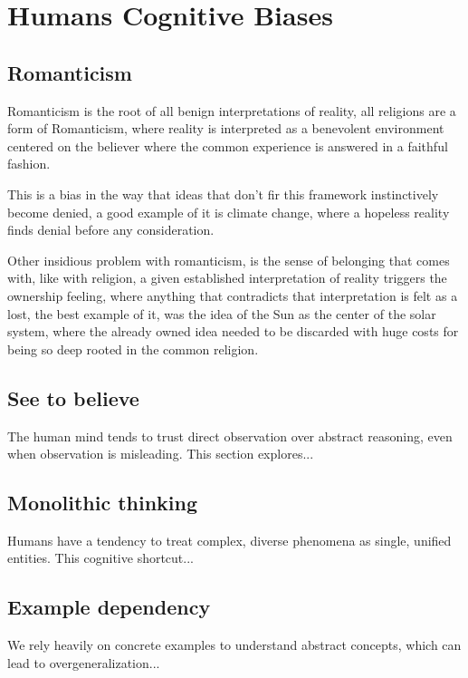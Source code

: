 \chapter{Humans Cognitive Biases}

\section{Romanticism}

Romanticism is the root of all benign interpretations of reality, all religions are a form
of Romanticism, where reality is interpreted as a benevolent environment centered on the
believer where the common experience is answered in a faithful fashion.

This is a bias in the way that ideas that don't fir this framework instinctively become denied,
a good example of it is climate change, where a hopeless reality finds denial before any
consideration.

Other insidious problem with romanticism, is the sense of belonging that comes with, like
with religion, a given established interpretation of reality triggers the ownership feeling,
where anything that contradicts that interpretation is felt as a lost, the best example of it,
was the idea of the Sun as the center of the solar system, where the already owned idea needed
to be discarded with huge costs for being so deep rooted in the common religion.

\section{See to believe}

The human mind tends to trust direct observation over abstract reasoning, 
even when observation is misleading. This section explores...

\section{Monolithic thinking}

Humans have a tendency to treat complex, diverse phenomena as single, 
unified entities. This cognitive shortcut...

\section{Example dependency}

We rely heavily on concrete examples to understand abstract concepts, 
which can lead to overgeneralization...
